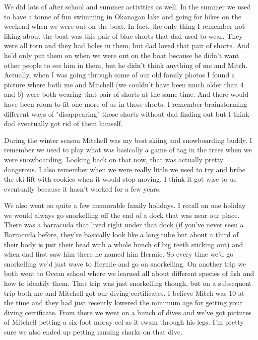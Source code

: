 We did lots of after school and summer activities as well. In the summer we used to have a tonne of fun swimming in Okanagan lake and going for hikes on the weekend when we were out on the boat. In fact, the only thing I remember not liking about the boat was this pair of blue shorts that dad used to wear. They were all torn and they had holes in them, but dad loved that pair of shorts. And he'd only put them on when we were out on the boat because he didn't want other people to see him in them, but he didn't think anything of me and Mitch. Actually, when I was going through some of our old family photos I found a picture where both me and Mitchell (we couldn't have been much older than 4 and 6) were both wearing that pair of shorts at the same time. And there would have been room to fit one more of us in those shorts. I remember brainstorming different ways of "disappearing" those shorts without dad finding out but I think dad eventually got rid of them himself.

During the winter season Mitchell was my best skiing and snowboarding buddy. I remember we used to play what was basically a game of tag in the trees when we were snowboarding. Looking back on that now, that was actually pretty dangerous. I also remember when we were really little we used to try and bribe the ski lift with cookies when it would stop moving. I think it got wise to us eventually because it hasn't worked for a few years.

We also went on quite a few memorable family holidays. I recall on one holiday we would always go snorkelling off the end of a dock that was near our place. There was a barracuda that lived right under that dock (if you've never seen a Barracuda before, they're basically look like a long tube but about a third of their body is just their head with a whole bunch of big teeth sticking out) and when dad first saw him there he named him Hermie. So every time we'd go snorkelling we'd just wave to Hermie and go on snorkelling. On another trip we both went to Ocean school where we learned all about different species of fish and how to identify them. That trip was just snorkelling though, but on a subsequent trip both me and Mitchell got our diving certificates. I believe Mitch was 10 at the time and they had just recently lowered the minimum age for getting your diving certificate. From there we went on a bunch of dives and we've got pictures of Mitchell petting a six-foot moray eel as it swam through his legs. I'm pretty sure we also ended up petting nursing sharks on that dive.

